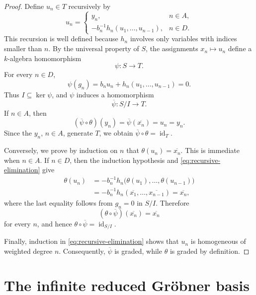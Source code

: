 \documentclass[11pt,reqno]{amsart}
\theoremstyle{definition}
\theoremstyle{remark}
\theoremstyle{plain}
\begin{document}
\begin{proof}
Define \(u_n\in T\) recursively by
\begin{equation}\label{eq:recursive-elimination}
 u_n=
 \begin{cases}
   y_n,&n\in A,\\
   -b_n^{-1}h_n(u_1,\ldots,u_{n-1}),&n\in D.
 \end{cases}
\end{equation}
This recursion is well defined because \(h_n\) involves only variables
with indices smaller than \(n\).  By the universal property of \(S\),
the assignments \(x_n\mapsto u_n\) define a \(k\)-algebra homomorphism
\[
 \psi:S\longrightarrow T.
\]
For every \(n\in D\),
\[
 \psi(g_n)=b_nu_n+h_n(u_1,\ldots,u_{n-1})=0.
\]
Thus \(I\subseteq\ker\psi\), and \(\psi\) induces a homomorphism
\[
 \overline\psi:S/I\longrightarrow T.
\]
If \(n\in A\), then
\[
 (\overline\psi\circ\theta)(y_n)
 =\overline\psi(\overline{x_n})=u_n=y_n.
\]
Since the \(y_n\), \(n\in A\), generate \(T\), we obtain
\(\overline\psi\circ\theta=\operatorname{id}_T\).

Conversely, we prove by induction on \(n\) that
\(\theta(u_n)=\overline{x_n}\).  This is immediate when \(n\in A\).
If \(n\in D\), then the induction hypothesis and
\eqref{eq:recursive-elimination} give
\[
\begin{aligned}
 \theta(u_n)
 &=-b_n^{-1}
   h_n\bigl(\theta(u_1),\ldots,\theta(u_{n-1})\bigr)\\
 &=-b_n^{-1}
   h_n(\overline{x_1},\ldots,\overline{x_{n-1}})
  =\overline{x_n},
\end{aligned}
\]
where the last equality follows from \(g_n=0\) in \(S/I\).
Therefore
\[
 (\theta\circ\overline\psi)(\overline{x_n})
 =\overline{x_n}
\]
for every \(n\), and hence
\(\theta\circ\overline\psi=\operatorname{id}_{S/I}\).

Finally, induction in \eqref{eq:recursive-elimination} shows that
\(u_n\) is homogeneous of weighted degree \(n\).  Consequently,
\(\overline\psi\) is graded, while \(\theta\) is graded by definition.
\end{proof}




\section{The infinite reduced Gr\"obner basis}\label{sec:groebner}
\end{document}
